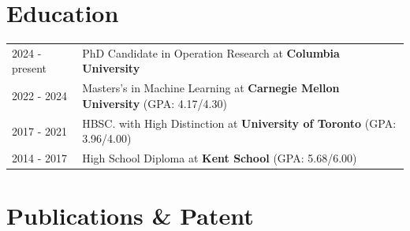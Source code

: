 \section{Education}
\begin{tabularx}{\linewidth}{@{}l X@{}}
2024 - present & PhD Candidate in Operation Research at \textbf{Columbia University} \\

2022 - 2024 & Masters's in Machine Learning at \textbf{Carnegie Mellon University} \hfill (GPA: 4.17/4.30) \\

2017 - 2021 & HBSC. with High Distinction at \textbf{University of Toronto} \hfill  (GPA: 3.96/4.00) \\

2014 - 2017 & High School Diploma at \textbf{Kent School} \hfill  (GPA: 5.68/6.00) \\
\end{tabularx}

\section{Publications \& Patent}
\begin{refsection}
\nocite{*}
\printbibliography[keyword=pub,heading=subbibliography,title={Published}]
\printbibliography[keyword=arx,heading=subbibliography,title={Submitted}]
\printbibliography[keyword=pat,heading=subbibliography,title={Patents}]

\end{refsection}


